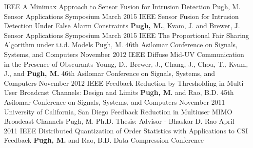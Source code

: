 


\begin{cventries}

\cvpublicationentry
    {IEEE}
    {A Minimax Approach to Sensor Fusion for Intrusion Detection}
    {Pugh, M.}
    {Sensor Applications Symposium}
    {March 2015}
    {}
\cvpublicationentry
    {IEEE}
    {Sensor Fusion for Intrusion Detection Under False Alarm Constraints}
    {\textbf{Pugh, M.}, Kvam, J. and Brewer, J.}
    {Sensor Applications Symposium}
    {March 2015}
    {}
\cvpublicationentry
    {IEEE}
    {The Proportional Fair Sharing Algorithm under i.i.d. Models}
    {Pugh, M.}
    {46th Asilomar Conference on Signals, Systems, and Computers}
    {November 2012}
    {}
\cvpublicationentry
    {IEEE}
    {Diffuse Mid-UV Communication in the Presence of Obscurants}
    {Young, D., Brewer, J., Chang, J., Chou, T., Kvam, J., and \textbf{Pugh, M.}}
    {46th Asilomar Conference on Signals, Systems, and Computers}
    {November 2012}
    {}
\cvpublicationentry
    {IEEE}
    {Feedback Reduction by Thresholding in Multi-User Broadcast Channels: Design and Limits}
    {\textbf{Pugh, M.} and Rao, B.D.}
    {45th Asilomar Conference on Signals, Systems, and Computers}
    {November 2011}
    {}
\cvpublicationentry
    {University of California, San Diego}
    {Feedback Reduction in Multiuser MIMO Broadcast Channels}
    {Pugh, M.}
    {Ph.D. Thesis: Advisor - Bhaskar D. Rao}
    {April 2011}
    {}
\cvpublicationentry
    {IEEE}
    {Distributed Quantization of Order Statistics with Applications to CSI Feedback}
    {\textbf{Pugh, M.} and Rao, B.D.}
    {Data Compression Conference}

\end{cventries}
